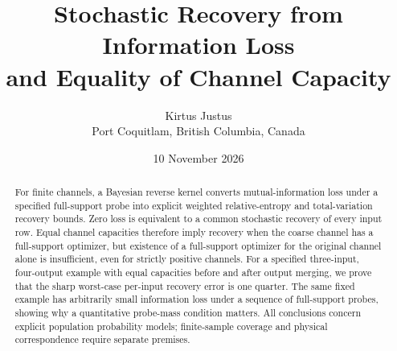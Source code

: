\documentclass[11pt]{article}
\title{Stochastic Recovery from Information Loss\texorpdfstring{\\}{ }
and Equality of Channel Capacity}
\author{Kirtus Justus\\\small Port Coquitlam, British Columbia, Canada}
\date{10 November 2026}
\begin{document}
\maketitle
\begin{abstract}
For finite channels, a Bayesian reverse kernel converts mutual-information
loss under a specified full-support probe into explicit weighted relative-entropy
and total-variation recovery bounds.  Zero loss is equivalent to a common
stochastic recovery of every input row.  Equal channel capacities therefore
imply recovery when the coarse channel has a full-support optimizer, but
existence of a full-support optimizer for the original channel alone is
insufficient, even for strictly positive channels.  For a specified three-input,
four-output example with equal capacities before and after output merging,
we prove that the sharp worst-case per-input recovery error is one quarter.
The same fixed example has arbitrarily small information loss under a sequence
of full-support probes, showing why a quantitative probe-mass condition matters.
All conclusions concern explicit population probability models; finite-sample
coverage and physical correspondence require separate premises.
\end{abstract}


\end{document}
